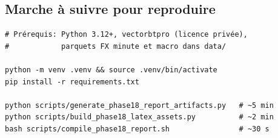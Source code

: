 \subsection{Marche à suivre pour reproduire}

\begin{verbatim}
# Prérequis: Python 3.12+, vectorbtpro (licence privée),
#            parquets FX minute et macro dans data/

python -m venv .venv && source .venv/bin/activate
pip install -r requirements.txt

python scripts/generate_phase18_report_artifacts.py   # ~5 min
python scripts/build_phase18_latex_assets.py          # ~2 min
bash scripts/compile_phase18_report.sh                # ~30 s
\end{verbatim}
